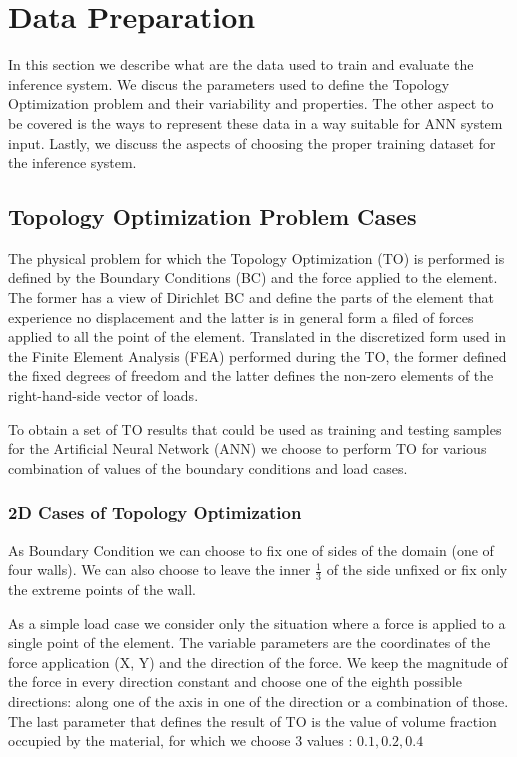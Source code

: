 
\section{Data Preparation}

In this section we describe what are the data used to train and evaluate the inference system.
We discus the parameters used to define the Topology Optimization problem and their variability and properties.
The other aspect to be covered is the ways to represent these data in a way suitable for ANN system input.
Lastly, we discuss the aspects of choosing the proper training dataset for the inference system.

\subsection{Topology Optimization Problem Cases}

The physical problem for which the Topology Optimization (TO) is performed is defined by the Boundary Conditions (BC) and the force applied to the element. 
The former has a view of Dirichlet BC and define the parts of the element that experience no displacement and the latter is in general form a filed of forces applied to all the point of the element. 
Translated in the discretized form used in the Finite Element Analysis (FEA) performed during the TO, the former defined the fixed degrees of freedom and the latter defines the non-zero elements of the right-hand-side vector of loads.
\medskip

To obtain a set of TO results that could be used as training and testing samples for the Artificial Neural Network (ANN) we choose to perform TO for various combination of values of the boundary conditions and load cases.
\medskip

\subsubsection{2D Cases of Topology Optimization}

As Boundary Condition we can choose to fix one of sides of the domain (one of four walls). 
We can also choose to leave the inner $\frac{1}{3}$ of the side unfixed or fix only the extreme points of the wall. 
\medskip

As a simple load case we consider only the situation where a force is applied to a single point of the element. 
The variable parameters are the coordinates of the force application (X, Y) and the direction of the force.
We keep the magnitude of the force in every direction constant and choose one of the eighth possible directions: along one of the axis in one of the direction or a combination of those.
The last parameter that defines the result of TO is the value of volume fraction occupied by the material, for which we choose $3$ values : $0.1, 0.2, 0.4$
\medskip

